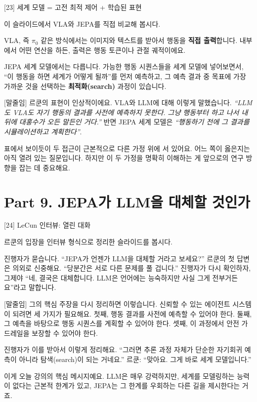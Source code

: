 \documentclass[aspectratio=169,10pt]{beamer}
\newenvironment{script}{%
  \footnotesize
  \setlength{\parskip}{0.5em}
  \setlength{\parindent}{0pt}
}{}
\begin{document}
\begin{frame}{[23] 세계 모델 = 고전 최적 제어 + 학습된 표현}
\begin{script}
이 슬라이드에서 VLA와 JEPA를 직접 비교해 봅시다.

VLA, 즉 $\pi_0$ 같은 방식에서는 이미지와 텍스트를 받아서 행동을 \textbf{직접 출력}합니다. 내부에서 어떤 연산을 하든, 출력은 행동 토큰이나 관절 궤적이에요.

JEPA 세계 모델에서는 다릅니다. 가능한 행동 시퀀스들을 세계 모델에 넣어보면서, ``이 행동을 하면 세계가 어떻게 될까''를 먼저 예측하고, 그 예측 결과 중 목표에 가장 가까운 것을 선택하는 \textbf{최적화(search)} 과정이 있습니다.

[말줄임] 르쿤의 표현이 인상적이에요. VLA와 LLM에 대해 이렇게 말했습니다. \textit{``LLM도 VLA도 자기 행동의 결과를 사전에 예측하지 못한다. 그냥 행동부터 하고 나서 내 뒤에 대홍수가 오든 말든인 거다.''} 반면 JEPA 세계 모델은 \textit{``행동하기 전에 그 결과를 시뮬레이션하고 계획한다''}.

표에서 보이듯이 두 접근이 근본적으로 다른 가정 위에 서 있어요. 어느 쪽이 옳은지는 아직 열려 있는 질문입니다. 하지만 이 두 가정을 명확히 이해하는 게 앞으로의 연구 방향을 잡는 데 중요해요.
\end{script}
\end{frame}

\section{Part 9. JEPA가 LLM을 대체할 것인가}

\begin{frame}{[24] LeCun 인터뷰: 열린 대화}
\begin{script}
르쿤의 입장을 인터뷰 형식으로 정리한 슬라이드를 봅시다.

진행자가 묻습니다. ``JEPA가 언젠가 LLM을 대체할 거라고 보세요?'' 르쿤의 첫 답변은 의외로 신중해요. ``당분간은 서로 다른 문제를 풀 겁니다.'' 진행자가 다시 확인하자, 그제야 ``네, 결국은 대체합니다. LLM은 언어에는 능숙하지만 사실 그게 전부거든요''라고 말합니다.

[말줄임] 그의 핵심 주장을 다시 정리하면 이렇습니다. 신뢰할 수 있는 에이전트 시스템이 되려면 세 가지가 필요해요. 첫째, 행동 결과를 사전에 예측할 수 있어야 한다. 둘째, 그 예측을 바탕으로 행동 시퀀스를 계획할 수 있어야 한다. 셋째, 이 과정에서 안전 가드레일을 보장할 수 있어야 한다.

진행자가 이를 받아서 이렇게 정리해요. ``그러면 추론 과정 자체가 단순한 자기회귀 예측이 아니라 탐색(search)이 되는 거네요.'' 르쿤: ``맞아요. 그게 바로 세계 모델입니다.''

이게 오늘 강의의 핵심 메시지예요. LLM은 매우 강력하지만, 세계를 모델링하는 능력이 없다는 근본적 한계가 있고, JEPA는 그 한계를 우회하는 다른 길을 제시한다는 거죠.
\end{script}
\end{frame}
\end{document}
